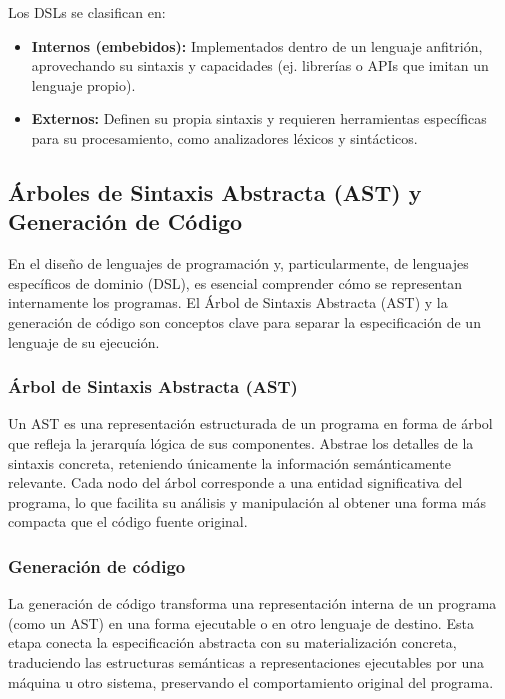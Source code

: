 \documentclass{article}
\begin{document}
Los DSLs se clasifican en:
\begin{itemize}
    \item \textbf{Internos (embebidos):} Implementados dentro de un lenguaje anfitrión, aprovechando su sintaxis y capacidades (ej. librerías o APIs que imitan un lenguaje propio).
    \item \textbf{Externos:} Definen su propia sintaxis y requieren herramientas específicas para su procesamiento, como analizadores léxicos y sintácticos.
\end{itemize}

\subsection{Árboles de Sintaxis Abstracta (AST) y Generación de Código}

En el diseño de lenguajes de programación y, particularmente, de lenguajes específicos de dominio (DSL), es esencial comprender cómo se representan internamente los programas. El Árbol de Sintaxis Abstracta (AST) y la generación de código son conceptos clave para separar la especificación de un lenguaje de su ejecución.

\subsubsection{Árbol de Sintaxis Abstracta (AST)}

Un AST es una representación estructurada de un programa en forma de árbol que refleja la jerarquía lógica de sus componentes. Abstrae los detalles de la sintaxis concreta, reteniendo únicamente la información semánticamente relevante. Cada nodo del árbol corresponde a una entidad significativa del programa, lo que facilita su análisis y manipulación al obtener una forma más compacta que el código fuente original.

\subsubsection{Generación de código}

La generación de código transforma una representación interna de un programa (como un AST) en una forma ejecutable o en otro lenguaje de destino. Esta etapa conecta la especificación abstracta con su materialización concreta, traduciendo las estructuras semánticas a representaciones ejecutables por una máquina u otro sistema, preservando el comportamiento original del programa.
\end{document}
